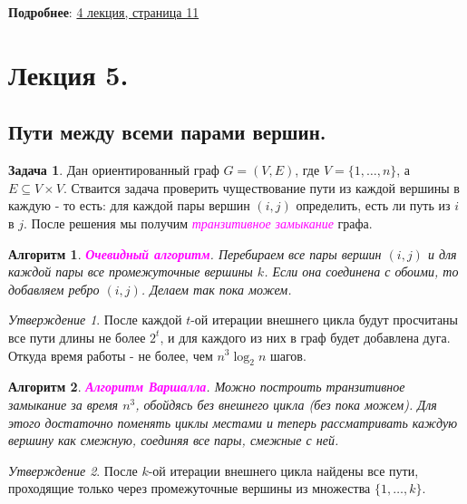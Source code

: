 \documentclass[a4paper]{article}
\theoremstyle{indented}
\newtheorem{alg}{Алгоритм}
\theoremstyle{definition}
\newtheorem{prob}{Задача}
\theoremstyle{remark}
\newtheorem{stat}{Утверждение}
\begin{document}
\textbf{Подробнее}: \href{https://users.math-cs.spbu.ru/~okhotin/teaching/algorithms_2020/okhotin_algorithms_2020_l4.pdf}{4 лекция, страница 11} 

\section{Лекция 5.}

\subsection{Пути между всеми парами вершин.}

\begin{prob}
    Дан ориентированный граф $G=(V, E)$, где $V = \{1, \ldots, n\}$, а $E\subseteq V \times V$. Стваится задача проверить чуществование пути из каждой вершины в каждую - то есть: для каждой пары вершин $(i, j)$ определить, есть ли путь из $i$ в $j$. После решения мы получим \textcolor{magenta}{\hypertarget{d10}{\textit{транзитивное замыкание}}} графа.
\end{prob}

\begin{alg}
    \textcolor{magenta}{\hypertarget{t22}{\textbf{Очевидный алгоритм}}}. Перебираем все пары вершин $(i, j)$ и для каждой пары все промежуточные вершины $k$. Если она соединена с обоими, то добавляем ребро $(i, j)$. Делаем так пока можем.
\end{alg}

\begin{stat}
    После каждой $t$-ой итерации внешнего цикла будут просчитаны все пути длины не более $2^t$, и для каждого из них в граф будет добавлена дуга. Откуда время работы - не более, чем $n^3 \log_2 n$ шагов.
\end{stat}

\begin{alg}
    \textcolor{magenta}{\hypertarget{t23}{\textbf{Алгоритм Варшалла}}}. Можно построить транзитивное замыкание за время $n^3$, обойдясь без внешнего цикла (без пока можем). Для этого достаточно поменять циклы местами и теперь рассматривать каждую вершину как смежную, соединяя все пары, смежные с ней.
\end{alg}

\begin{stat}
    После $k$-ой итерации внешнего цикла найдены все пути, проходящие только через промежуточные вершины из множества $\{1, \ldots, k\}$. 
\end{stat}
\end{document}
